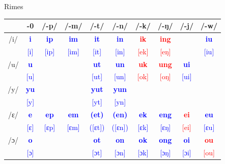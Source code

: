\documentclass{beamer}
\begin{document}
\begin{frame}[fragile]{Rimes}

\begin{table}
\scriptsize
\begin{tabular}{c|c c c c c c c c c}
    \hline
     & -0 & /-p/ & /-m/ & /-t/ & /-n/ & /-k/ & /-ŋ/ & /-j/ & /-w/\\ \hline
    /i/ & \textcolor{blue}{\textbf{i}} & \textcolor{blue}{\textbf{ip}} & \textcolor{blue}{\textbf{im}} & \textcolor{blue}{\textbf{it}} & \textcolor{blue}{\textbf{in}} & \textcolor{red}{\textbf{ik}} & \textcolor{red}{\textbf{ing}} & & \textcolor{blue}{\textbf{iu}}\\
     & \textcolor{blue}{[i]} & \textcolor{blue}{[ip]} & \textcolor{blue}{[im]} & \textcolor{blue}{[it]} & \textcolor{blue}{[in]} & \textcolor{red}{[ek]} & \textcolor{red}{[eŋ]} & & \textcolor{blue}{[iu]}\\ \hline
    /u/ & \textcolor{blue}{\textbf{u}} & & & \textcolor{blue}{\textbf{ut}} & \textcolor{blue}{\textbf{un}} & \textcolor{red}{\textbf{uk}} & \textcolor{red}{\textbf{ung}} & \textcolor{blue}{\textbf{ui}} & \\
     & \textcolor{blue}{[u]} & & & \textcolor{blue}{[ut]} & \textcolor{blue}{[un]} & \textcolor{red}{[ok]} & \textcolor{red}{[oŋ]} & \textcolor{blue}{[ui]} & \\ \hline
    /y/ & \textcolor{blue}{\textbf{yu}} & & & \textcolor{blue}{\textbf{yut}} & \textcolor{blue}{\textbf{yun}} & & & & \\
     & \textcolor{blue}{[y]} & & & \textcolor{blue}{[yt]} & \textcolor{blue}{[yn]} & & & & \\ \hline
    /ɛ/ & \textcolor{blue}{\textbf{e}} & \textcolor{blue}{\textbf{ep}} & \textcolor{blue}{\textbf{em}} & \textcolor{blue}{\textbf{(et)}} & \textcolor{blue}{\textbf{(en)}} & \textcolor{blue}{\textbf{ek}} & \textcolor{blue}{\textbf{eng}} & \textcolor{red}{\textbf{ei}} & \textcolor{blue}{\textbf{eu}} \\
     & \textcolor{blue}{[ɛ]} & \textcolor{blue}{[ɛp]} & \textcolor{blue}{[ɛm]} & \textcolor{blue}{([ɛt])} & \textcolor{blue}{([ɛn])} & \textcolor{blue}{[ɛk]} & \textcolor{blue}{[ɛŋ]} & \textcolor{red}{[ei]} & \textcolor{blue}{[ɛu]} \\ \hline
    /ɔ/ & \textcolor{blue}{\textbf{o}} & & & \textcolor{blue}{\textbf{ot}} & \textcolor{blue}{\textbf{on}} & \textcolor{blue}{\textbf{ok}} & \textcolor{blue}{\textbf{ong}} & \textcolor{blue}{\textbf{oi}} & \textcolor{red}{\textbf{ou}} \\
     & \textcolor{blue}{[ɔ]} & & & \textcolor{blue}{[ɔt]} & \textcolor{blue}{[ɔn]} & \textcolor{blue}{[ɔk]} & \textcolor{blue}{[ɔŋ]} & \textcolor{blue}{[ɔi]} & \textcolor{red}{[ou]} \\ \hline

\end{tabular}
\end{table}
\end{frame}
\end{document}

